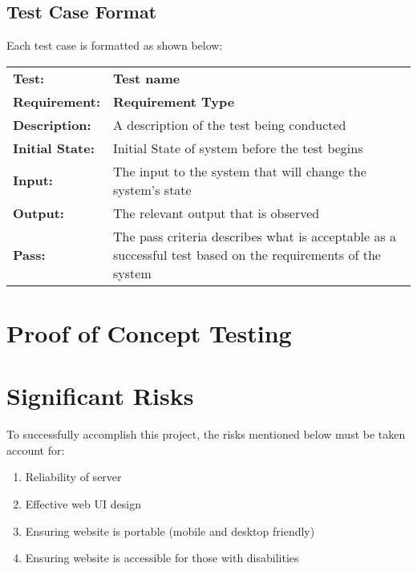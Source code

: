 \documentclass{article}
\begin{document}
	\subsection{Test Case Format}
	Each test case is formatted as shown below:

	\begin{mdframed}[linewidth=1pt]
	\begin{tabularx}{\textwidth}{@{}p{3cm}X@{}}
	{\bf Test:} & {\bf Test name}\\[\baselineskip]
	{\bf Requirement:} & {\bf Requirement Type}\\[\baselineskip]
	{\bf Description:} & A description of the test being conducted\\[0.5\baselineskip]
	{\bf Initial State:} & Initial State of system before the test begins\\[0.5\baselineskip]
	{\bf Input:} &  The input to the system that will change the system's state\\[0.5\baselineskip]
	{\bf Output:} & The relevant output that is observed\\[0.5\baselineskip]
	{\bf Pass:} & The pass criteria describes what is acceptable as a successful test based on the requirements of the system
	\end{tabularx}
	\end{mdframed}
		
	

\newpage


\section{Proof of Concept Testing}
\section{Significant Risks}
To successfully accomplish this project, the risks mentioned below must be taken account for:
\begin{enumerate}
	\item Reliability of server
	\item Effective web UI design
	\item Ensuring website is portable (mobile and desktop friendly)
	\item Ensuring website is accessible for those with disabilities
	
\end{enumerate}
\end{document}

